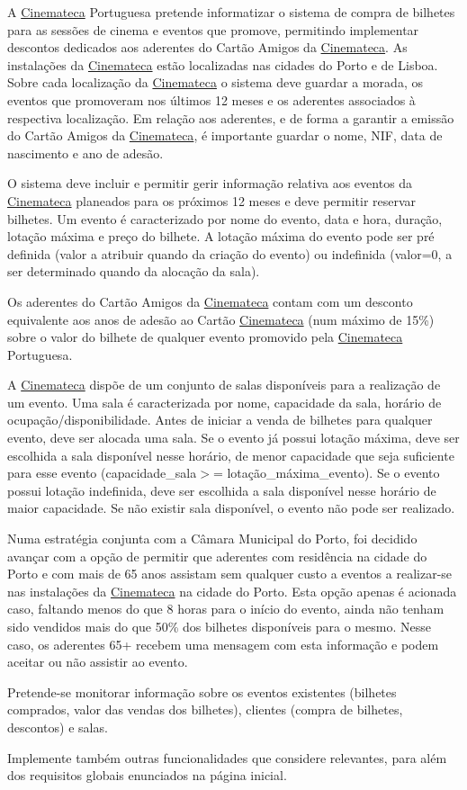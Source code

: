 A \mbox{\hyperlink{class_cinemateca}{Cinemateca}} Portuguesa pretende informatizar o sistema de compra de bilhetes para as sessões de cinema e eventos que promove, permitindo implementar descontos dedicados aos aderentes do Cartão Amigos da \mbox{\hyperlink{class_cinemateca}{Cinemateca}}. As instalações da \mbox{\hyperlink{class_cinemateca}{Cinemateca}} estão localizadas nas cidades do Porto e de Lisboa. Sobre cada localização da \mbox{\hyperlink{class_cinemateca}{Cinemateca}} o sistema deve guardar a morada, os eventos que promoveram nos últimos 12 meses e os aderentes associados à respectiva localização. Em relação aos aderentes, e de forma a garantir a emissão do Cartão Amigos da \mbox{\hyperlink{class_cinemateca}{Cinemateca}}, é importante guardar o nome, N\+IF, data de nascimento e ano de adesão.

O sistema deve incluir e permitir gerir informação relativa aos eventos da \mbox{\hyperlink{class_cinemateca}{Cinemateca}} planeados para os próximos 12 meses e deve permitir reservar bilhetes. Um evento é caracterizado por nome do evento, data e hora, duração, lotação máxima e preço do bilhete. A lotação máxima do evento pode ser pré definida (valor a atribuir quando da criação do evento) ou indefinida (valor=0, a ser determinado quando da alocação da sala).

Os aderentes do Cartão Amigos da \mbox{\hyperlink{class_cinemateca}{Cinemateca}} contam com um desconto equivalente aos anos de adesão ao Cartão \mbox{\hyperlink{class_cinemateca}{Cinemateca}} (num máximo de 15\%) sobre o valor do bilhete de qualquer evento promovido pela \mbox{\hyperlink{class_cinemateca}{Cinemateca}} Portuguesa.

A \mbox{\hyperlink{class_cinemateca}{Cinemateca}} dispõe de um conjunto de salas disponíveis para a realização de um evento. Uma sala é caracterizada por nome, capacidade da sala, horário de ocupação/disponibilidade. Antes de iniciar a venda de bilhetes para qualquer evento, deve ser alocada uma sala. Se o evento já possui lotação máxima, deve ser escolhida a sala disponível nesse horário, de menor capacidade que seja suficiente para esse evento (capacidade\+\_\+sala$>$= lotação\+\_\+máxima\+\_\+evento). Se o evento possui lotação indefinida, deve ser escolhida a sala disponível nesse horário de maior capacidade. Se não existir sala disponível, o evento não pode ser realizado.

Numa estratégia conjunta com a Câmara Municipal do Porto, foi decidido avançar com a opção de permitir que aderentes com residência na cidade do Porto e com mais de 65 anos assistam sem qualquer custo a eventos a realizar-\/se nas instalações da \mbox{\hyperlink{class_cinemateca}{Cinemateca}} na cidade do Porto. Esta opção apenas é acionada caso, faltando menos do que 8 horas para o início do evento, ainda não tenham sido vendidos mais do que 50\% dos bilhetes disponíveis para o mesmo. Nesse caso, os aderentes 65+ recebem uma mensagem com esta informação e podem aceitar ou não assistir ao evento.

Pretende-\/se monitorar informação sobre os eventos existentes (bilhetes comprados, valor das vendas dos bilhetes), clientes (compra de bilhetes, descontos) e salas.

Implemente também outras funcionalidades que considere relevantes, para além dos requisitos globais enunciados na página inicial. 